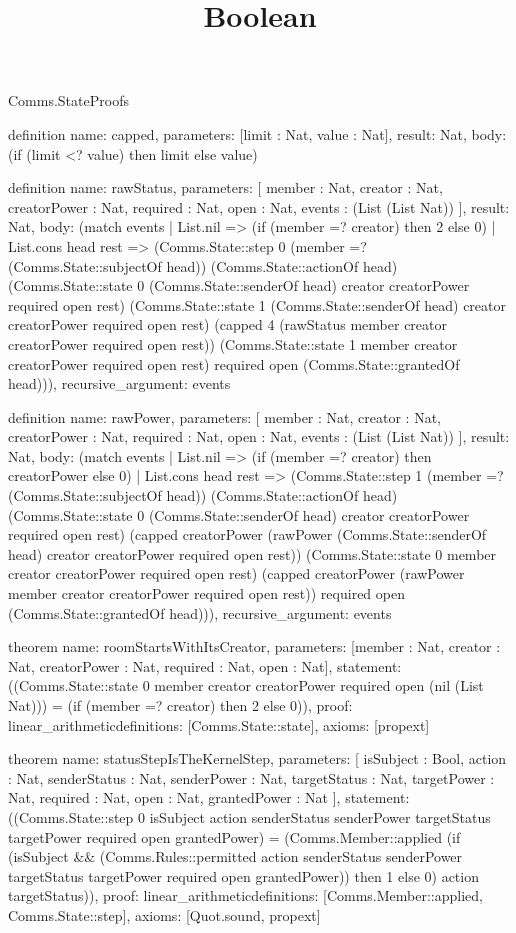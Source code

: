 \begin{lexlean}{Comms.StateProofs}
\title{Boolean}
\begin{semanticmodule}
definition{
  name: capped,
  parameters: [limit : Nat, value : Nat],
  result: Nat,
  body: (if (limit <? value) then limit else value)
}

definition{
  name: rawStatus,
  parameters: [
    member : Nat,
    creator : Nat,
    creatorPower : Nat,
    required : Nat,
    open : Nat,
    events : (List (List Nat))
  ],
  result: Nat,
  body: (match events
    | List.nil => (if (member =? creator) then 2 else 0)
    | List.cons head rest => (Comms.State::step 0 (member =? (Comms.State::subjectOf head)) (Comms.State::actionOf head) (Comms.State::state 0 (Comms.State::senderOf head) creator creatorPower required open rest) (Comms.State::state 1 (Comms.State::senderOf head) creator creatorPower required open rest) (capped 4 (rawStatus member creator creatorPower required open rest)) (Comms.State::state 1 member creator creatorPower required open rest) required open (Comms.State::grantedOf head))),
  recursive_argument: events
}

definition{
  name: rawPower,
  parameters: [
    member : Nat,
    creator : Nat,
    creatorPower : Nat,
    required : Nat,
    open : Nat,
    events : (List (List Nat))
  ],
  result: Nat,
  body: (match events
    | List.nil => (if (member =? creator) then creatorPower else 0)
    | List.cons head rest => (Comms.State::step 1 (member =? (Comms.State::subjectOf head)) (Comms.State::actionOf head) (Comms.State::state 0 (Comms.State::senderOf head) creator creatorPower required open rest) (capped creatorPower (rawPower (Comms.State::senderOf head) creator creatorPower required open rest)) (Comms.State::state 0 member creator creatorPower required open rest) (capped creatorPower (rawPower member creator creatorPower required open rest)) required open (Comms.State::grantedOf head))),
  recursive_argument: events
}

theorem{
  name: roomStartsWithItsCreator,
  parameters: [member : Nat, creator : Nat, creatorPower : Nat, required : Nat, open : Nat],
  statement: ((Comms.State::state 0 member creator creatorPower required open (nil (List Nat))) = (if (member =? creator) then 2 else 0)),
  proof: linear_arithmetic{definitions: [Comms.State::state]},
  axioms: [propext]
}

theorem{
  name: statusStepIsTheKernelStep,
  parameters: [
    isSubject : Bool,
    action : Nat,
    senderStatus : Nat,
    senderPower : Nat,
    targetStatus : Nat,
    targetPower : Nat,
    required : Nat,
    open : Nat,
    grantedPower : Nat
  ],
  statement: ((Comms.State::step 0 isSubject action senderStatus senderPower targetStatus targetPower required open grantedPower) = (Comms.Member::applied (if (isSubject && (Comms.Rules::permitted action senderStatus senderPower targetStatus targetPower required open grantedPower)) then 1 else 0) action targetStatus)),
  proof: linear_arithmetic{definitions: [Comms.Member::applied, Comms.State::step]},
  axioms: [Quot.sound, propext]
}


\end{semanticmodule}
\end{lexlean}
